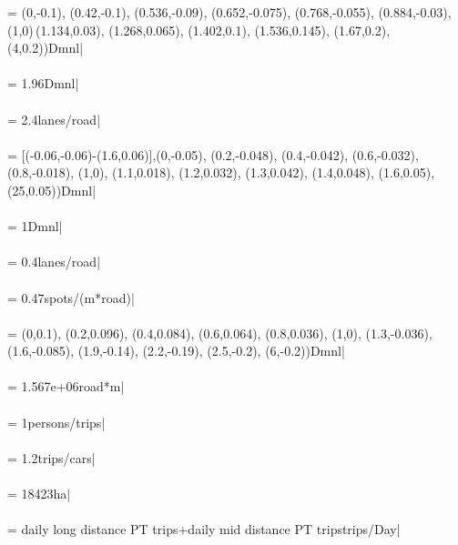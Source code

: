  = {\small (0,-0.1), (0.42,-0.1), (0.536,-0.09), (0.652,-0.075), (0.768,-0.055), (0.884,-0.03), (1,0)\,(1.134,0.03), (1.268,0.065), (1.402,0.1), (1.536,0.145), (1.67,0.2), (4,0.2))Dmnl|} \\ \\ 
 = {\small 1.96Dmnl|} \\ \\ 
 = {\small 2.4lanes/road|} \\ \\ 
 = {\small [(-0.06,-0.06)-(1.6,0.06)],(0,-0.05), (0.2,-0.048), (0.4,-0.042), (0.6,-0.032), (0.8,-0.018), (1,0), (1.1,0.018), (1.2,0.032), (1.3,0.042), (1.4,0.048), (1.6,0.05), (25,0.05))Dmnl|} \\ \\ 
 = {\small 1Dmnl|} \\ \\ 
 = {\small 0.4lanes/road|} \\ \\ 
 = {\small 0.47spots/(m*road)|} \\ \\ 
 = {\small (0,0.1), (0.2,0.096), (0.4,0.084), (0.6,0.064), (0.8,0.036), (1,0), (1.3,-0.036), (1.6,-0.085), (1.9,-0.14), (2.2,-0.19), (2.5,-0.2), (6,-0.2))Dmnl|} \\ \\ 
 = {\small 1.567e+06road*m|} \\ \\ 
 = {\small 1persons/trips|} \\ \\ 
 = {\small 1.2trips/cars|} \\ \\ 
 = {\small 18423ha|} \\ \\ 
 = {\small daily long distance PT trips+daily mid distance PT tripstrips/Day|} \\ \\ 
